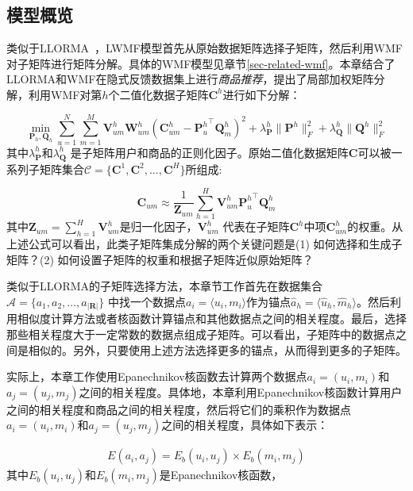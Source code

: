 \subsection{模型概览}
类似于LLORMA~\cite{lee2013local,lee2014local}，LWMF模型首先从原始数据矩阵选择子矩阵，然后利用WMF对子矩阵进行矩阵分解。具体的WMF模型见章节\ref{sec-related-wmf}。本章结合了LLORMA和WMF在隐式反馈数据集上进行\textit{商品推荐}，提出了局部加权矩阵分解，利用WMF对第$h$个二值化数据子矩阵$\mathbf{C}^h$进行如下分解：

\begin{equation}
\min_{\mathbf{P}_h,\mathbf{Q}_h}\sum_{u=1}^{N}\sum_{m=1}^{M}\mathbf{V}_{um}^h\mathbf{W}_{um}^h(\mathbf{C}_{um}^h-{\mathbf{P}_{u}^h}^\top \mathbf{Q}_{m}^h)^2+\lambda_\mathbf{P}^h\|\mathbf{P}^h\|_F^2+\lambda_\mathbf{Q}^h\|\mathbf{Q}^h\|_F^2
\end{equation}
其中$\lambda_\mathbf{P}^h$和$\lambda_\mathbf{Q}^h$ 是子矩阵用户和商品的正则化因子。原始二值化数据矩阵$\mathbf{C}$可以被一系列子矩阵集合$\mathcal{C}= \{\mathbf{C}^1,\mathbf{C}^2,...,\mathbf{C}^H\}$所组成:

\begin{equation}
\mathbf{C}_{um} \approx \frac{1}{\mathbf{Z}_{um}}\sum_{h=1}^H \mathbf{V}_{um}^h{\mathbf{P}^h_u}^\top \mathbf{Q}^h_m
\end{equation}
其中$\mathbf{Z}_{um} = \sum_{h=1}^H \mathbf{V}_{um}^{h}$是归一化因子，$\mathbf{V}^{h}_{um}$ 代表在子矩阵$\mathbf{C}^{h}$中项$\mathbf{C}^{h}_{um}$的权重。从上述公式可以看出，此类子矩阵集成分解的两个关键问题是(1) 如何选择和生成子矩阵？(2) 如何设置子矩阵的权重和根据子矩阵近似原始矩阵？

类似于LLORMA的子矩阵选择方法，本章节工作首先在数据集合$\mathcal{A}=\{a_1, a_2, ..., a_{|\mathbf{R}|}\}$ 中找一个数据点$a_i=\langle u_i, m_i \rangle$作为锚点$\hat{a}_h=\langle\hat{u}_h, \hat{m}_h\rangle$。然后利用相似度计算方法或者核函数计算锚点和其他数据点之间的相关程度。最后，选择那些相关程度大于一定常数的数据点组成子矩阵。可以看出，子矩阵中的数据点之间是相似的。另外，只要使用上述方法选择更多的锚点，从而得到更多的子矩阵。

实际上，本章工作使用Epanechnikov核函数去计算两个数据点$a_i=(u_i,m_i)$和$a_j = (u_j,m_j)$之间的相关程度。具体地，本章利用Epanechnikov核函数计算用户之间的相关程度和商品之间的相关程度，然后将它们的乘积作为数据点$a_i=(u_i,m_i)$和$a_j = (u_j,m_j)$之间的相关程度，具体如下表示：

\begin{eqnarray}
\mathit{E}(a_i, a_j)=\mathit{E_{b}}(u_i, u_j)\times\mathit{E_{b}}(m_i, m_j)
\end{eqnarray}
其中$\mathit{E_{b}}(u_i, u_j)$和$\mathit{E_{b}}(m_i, m_j)$是Epanechnikov核函数，

